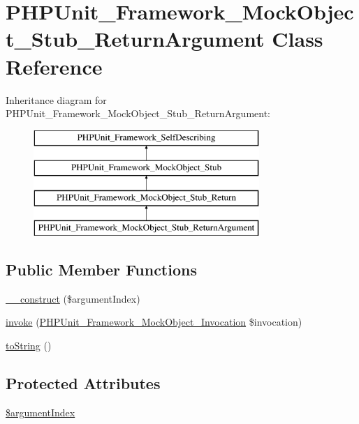 \hypertarget{class_p_h_p_unit___framework___mock_object___stub___return_argument}{}\section{P\+H\+P\+Unit\+\_\+\+Framework\+\_\+\+Mock\+Object\+\_\+\+Stub\+\_\+\+Return\+Argument Class Reference}
\label{class_p_h_p_unit___framework___mock_object___stub___return_argument}
Inheritance diagram for P\+H\+P\+Unit\+\_\+\+Framework\+\_\+\+Mock\+Object\+\_\+\+Stub\+\_\+\+Return\+Argument\+:\begin{figure}[H]
\begin{center}
\leavevmode
\includegraphics[height=4.000000cm]{class_p_h_p_unit___framework___mock_object___stub___return_argument}
\end{center}
\end{figure}
\subsection*{Public Member Functions}
\begin{DoxyCompactItemize}
\item 
\mbox{\hyperlink{class_p_h_p_unit___framework___mock_object___stub___return_argument_adac143cbd1469a404c4652e5c6c7a561}{\+\_\+\+\_\+construct}} (\$argument\+Index)
\item 
\mbox{\hyperlink{class_p_h_p_unit___framework___mock_object___stub___return_argument_af2fc26e6704e08d95f2ea1d9c5ffb865}{invoke}} (\mbox{\hyperlink{interface_p_h_p_unit___framework___mock_object___invocation}{P\+H\+P\+Unit\+\_\+\+Framework\+\_\+\+Mock\+Object\+\_\+\+Invocation}} \$invocation)
\item 
\mbox{\hyperlink{class_p_h_p_unit___framework___mock_object___stub___return_argument_a5558c5d549f41597377fa1ea8a1cefa3}{to\+String}} ()
\end{DoxyCompactItemize}
\subsection*{Protected Attributes}
\begin{DoxyCompactItemize}
\item 
\mbox{\hyperlink{class_p_h_p_unit___framework___mock_object___stub___return_argument_a03aa07eceba6a9e9d3688b742534d96a}{\$argument\+Index}}
\end{DoxyCompactItemize}


